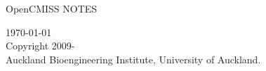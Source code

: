 \thispagestyle{empty}

\begin{center}
   \huge OpenCMISS NOTES
   \vspace{10mm}   

   \large {}
   \vspace{10mm}   

   \begin{figure}[htbp] \centering
   \end{figure} %

   \vspace{10mm}
   \today\\   %
   \vspace{55mm}
   \small
   \textcopyright \thickspace Copyright 2009-\\
   Auckland Bioengineering Institute, University of Auckland.
\end{center}





